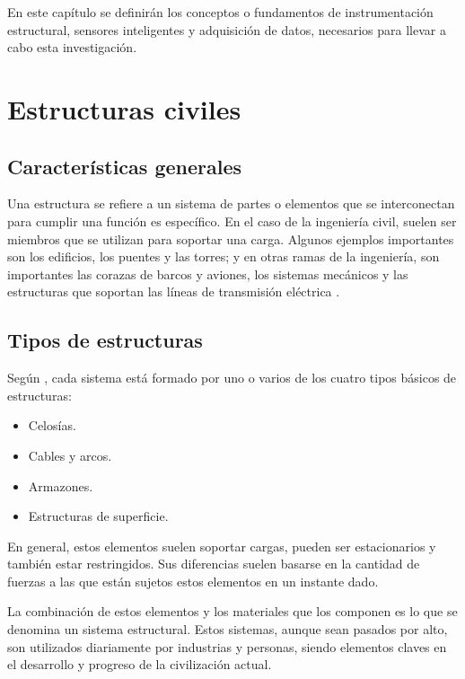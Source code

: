 
En este capítulo se definirán los conceptos  o fundamentos de instrumentación estructural, sensores inteligentes y adquisición de datos, necesarios para llevar a cabo esta investigación.

\section{Estructuras civiles}

\subsection{Características generales}

Una estructura se refiere a un sistema de partes o elementos que se interconectan para cumplir una función es específico. En el caso de la ingeniería civil, suelen ser miembros que se utilizan para soportar una carga. Algunos ejemplos importantes son los edificios, los puentes y las torres; y en otras ramas de la ingeniería, son importantes las corazas de barcos y aviones, los sistemas mecánicos y las estructuras que soportan las líneas de transmisión eléctrica \citep{hibbeler1997structural}.

\subsection{Tipos de estructuras}

Según \citet{hibbeler1997structural}, cada sistema está formado por uno o varios de los cuatro tipos básicos de estructuras: 

\begin{itemize}
    \item Celosías.
    \item Cables y arcos.
    \item Armazones.
    \item Estructuras de superficie.
\end{itemize}

En general, estos elementos suelen soportar cargas, pueden ser estacionarios y también estar restringidos. Sus diferencias suelen basarse en la cantidad de fuerzas a las que están sujetos estos elementos en un instante dado.

La combinación de estos elementos y los materiales que los componen es lo que se denomina un sistema estructural. Estos sistemas, aunque sean pasados por alto, son utilizados diariamente por industrias y personas, siendo elementos claves en el desarrollo y progreso de la civilización actual.

